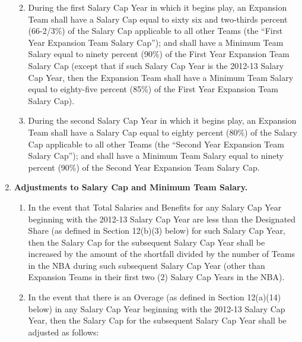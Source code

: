 \documentclass[
]{book}
\providecommand{\tightlist}{%
  \setlength{\itemsep}{0pt}\setlength{\parskip}{0pt}}
\begin{document}
\begin{enumerate}
  \begin{enumerate}
  \def\labelenumii{(\arabic{enumii})}
  \tightlist
  \item
    During the first Salary Cap Year in which it begins play, an Expansion Team shall have a Salary Cap equal to sixty six and two-thirds percent (66-2/3\%) of the Salary Cap applicable to all other Teams (the ``First Year Expansion Team Salary Cap''); and shall have a Minimum Team Salary equal to ninety percent (90\%) of the First Year Expansion Team Salary Cap (except that if such Salary Cap Year is the 2012-13 Salary Cap Year, then the Expansion Team shall have a Minimum Team Salary equal to eighty-five percent (85\%) of the First Year Expansion Team Salary Cap).
  \item
    During the second Salary Cap Year in which it begins play, an Expansion Team shall have a Salary Cap equal to eighty percent (80\%) of the Salary Cap applicable to all other Teams (the ``Second Year Expansion Team Salary Cap''); and shall have a Minimum Team Salary equal to ninety percent (90\%) of the Second Year Expansion Team Salary Cap.
  \end{enumerate}
\item
  \textbf{Adjustments to Salary Cap and Minimum Team Salary.}

  \begin{enumerate}
  \def\labelenumii{(\arabic{enumii})}
  \tightlist
  \item
    In the event that Total Salaries and Benefits for any Salary Cap Year beginning with the 2012-13 Salary Cap Year are less than the Designated Share (as defined in Section 12(b)(3) below) for such Salary Cap Year, then the Salary Cap for the subsequent Salary Cap Year shall be increased by the amount of the shortfall divided by the number of Teams in the NBA during such subsequent Salary Cap Year (other than Expansion Teams in their first two (2) Salary Cap Years in the NBA).
  \item
    In the event that there is an Overage (as defined in Section 12(a)(14) below) in any Salary Cap Year beginning with the 2012-13 Salary Cap Year, then the Salary Cap for the subsequent Salary Cap Year shall be adjusted as follows:


\end{enumerate}
\end{enumerate}
\end{document}
